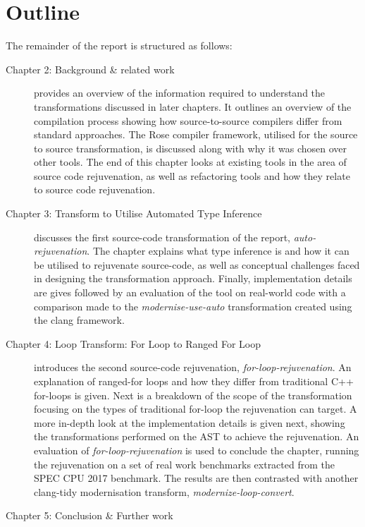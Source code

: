 \documentclass[bsc,frontabs,singlespacing,twoside,parskip,deptreport]{infthesis}
\begin{document}
\section{Outline}
The remainder of the report is structured as follows:
\begin{description}
    \item [Chapter 2: Background \& related work] provides an overview of the information required to understand the transformations discussed in later chapters. It outlines an overview of the compilation process showing how source-to-source compilers differ from standard approaches. The Rose compiler framework, utilised for the source to source transformation, is discussed along with why it was chosen over other tools. The end of this chapter looks at existing tools in the area of source code rejuvenation, as well as refactoring tools and how they relate to source code rejuvenation.
    
    \item [Chapter 3: Transform to Utilise Automated Type Inference] discusses the first source-code transformation of the report, \textit{auto-rejuvenation}. The chapter explains what type inference is and how it can be utilised to rejuvenate source-code, as well as conceptual challenges faced in designing the transformation approach. Finally, implementation details are gives followed by an evaluation of the tool on real-world code with a comparison made to the \textit{modernise-use-auto} transformation created using the clang framework. 
    
    \item [Chapter 4: Loop Transform: For Loop to Ranged For Loop] introduces the second source-code rejuvenation, \textit{for-loop-rejuvenation}. An explanation of ranged-for loops and how they differ from traditional C++ for-loops is given. Next is a breakdown of the scope of the transformation focusing on the types of traditional for-loop the rejuvenation can target. A more in-depth look at the implementation details is given next, showing the transformations performed on the AST to achieve the rejuvenation. An evaluation of \textit{for-loop-rejuvenation} is used to conclude the chapter, running the rejuvenation on a set of real work benchmarks extracted from the SPEC CPU 2017 benchmark. The results are then contrasted with another clang-tidy modernisation transform, \textit{modernize-loop-convert}. 
    
    \item [Chapter 5: Conclusion \& Further work] 
    
\end{description}
 
\end{document}
